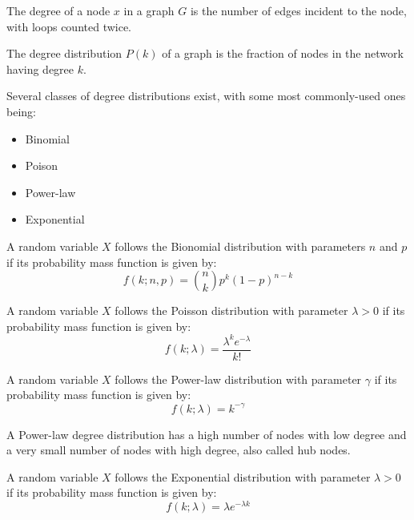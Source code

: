 \begin{mydef}
The degree of a node $x$ in a graph $G$ is the number of edges incident to the node, with loops counted twice. 
\end{mydef}

\begin{mydef}
The degree distribution $P(k)$ of a graph is the fraction of nodes in the network
having degree $k$. 
\end{mydef}

Several classes of degree distributions exist, with some most commonly-used ones being: 
\begin{itemize}
 \item Binomial
 \item Poison
 \item Power-law
 \item Exponential
\end{itemize}


\begin{mydef}
A random variable $X$ follows the Bionomial distribution with parameters $n$ and $p$ if its probability mass function is given by:
$$ f(k;n,p) = {n \choose k} p^k (1-p)^{n-k}$$
\end{mydef}

\begin{mydef}
A random variable $X$ follows the Poisson distribution with parameter $\lambda > 0$ if its probability mass function is given by:
$$ f(k;\lambda) = \frac{\lambda^k e^{-\lambda}}{k!}$$
\end{mydef}

\begin{mydef}
A random variable $X$ follows the Power-law distribution with parameter $\gamma$ if its probability mass function is given by:
$$ f(k;\lambda) = k^{-\gamma}$$
\end{mydef}

A Power-law degree distribution has a high number of nodes with low degree and a very small number of nodes with high degree, also called hub nodes.

\begin{mydef}
A random variable $X$ follows the Exponential distribution with parameter $\lambda > 0$ if its probability mass function is given by:
$$ f(k;\lambda) = \lambda e^{-\lambda k}$$
\end{mydef}


